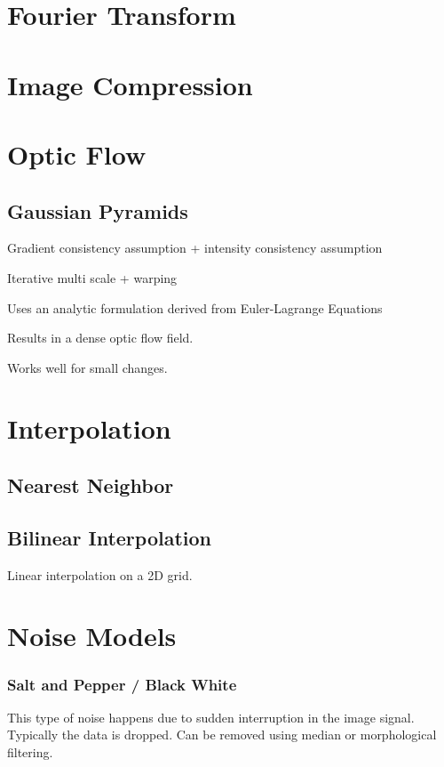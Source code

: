 \section{Fourier Transform}

\section{Image Compression}

\section{Optic Flow}


\subsection{Gaussian Pyramids}

Gradient consistency assumption + intensity consistency assumption

Iterative multi scale + warping

Uses an analytic formulation derived from Euler-Lagrange Equations

Results in a dense optic flow field.

Works well for small changes.

\section{Interpolation}

\subsection{Nearest Neighbor}

\subsection{Bilinear Interpolation}

Linear interpolation on a 2D grid. 


\section{Noise Models}

\subsubsection{Salt and Pepper / Black White}

This type of noise happens due to sudden interruption in the image signal.
Typically the data is dropped.
Can be removed using median or morphological filtering.

